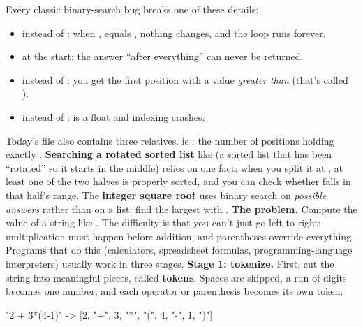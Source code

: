\documentclass[10pt,a4paper]{article}
\begin{document}
Every classic binary-search bug breaks one of these details:
\begin{itemize}
\item {} instead of : when ,  equals , nothing changes, and the loop runs forever.
\item {} at the start: the answer “after everything” can never be returned.
\item {} instead of \code{\textless{}\allowbreak{}}: you get the first position with a value \emph{greater than}  (that’s called ).
\item \code{/\allowbreak{}} instead of \code{/\allowbreak{}/\allowbreak{}}:  is a float and indexing crashes.
\end{itemize}
Today’s file also contains three relatives. \textbf{} is : the number of positions holding exactly . \textbf{Searching a rotated sorted list} like  (a sorted list that has been “rotated” so it starts in the middle) relies on one fact: when you split it at , at least one of the two halves is properly sorted, and you can check whether  falls in that half’s range. The \textbf{integer square root}  uses binary search on \emph{possible answers} rather than on a list: find the largest  with .
\textbf{The problem.} Compute the value of a string like . The difficulty is that you can’t just go left to right: multiplication must happen before addition, and parentheses override everything. Programs that do this (calculators, spreadsheet formulas, programming-language interpreters) usually work in three stages.
\textbf{Stage 1: tokenize.} First, cut the string into meaningful pieces, called \textbf{tokens}. Spaces are skipped, a run of digits becomes one number, and each operator or parenthesis becomes its own token:
\begin{txtcode}
"2 + 3*(4-1)"   ->   [2, "+", 3, "*", "(", 4, "-", 1, ")"]
\end{txtcode}
\end{document}
